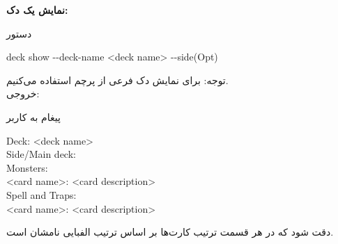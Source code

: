 \documentclass[]{article}
\begin{document}
\vspace{.5cm}
\textbf{نمایش یک دک:}
\begin{mybox}[colback=yellow]{دستور}
	\begin{latin}	
		deck show -{}-deck-name <deck name> -{}-side(Opt)
	\end{latin}
\end{mybox}
توجه: برای نمایش دک فرعی از پرچم  استفاده می‌کنیم.
\\
خروجی:
\begin{mybox}[colback=yellow]{پیغام به کاربر}
	\begin{latin}	
		Deck: <deck name> \\
		Side/Main deck: \\
		Monsters: \\
		<card name>: <card description> \\
		Spell and Traps: \\
		<card name>: <card description> \\
	\end{latin}
\end{mybox}
دقت شود که در هر قسمت ترتیب کارت‌ها بر اساس ترتیب الفبایی نامشان است.
\end{document}
